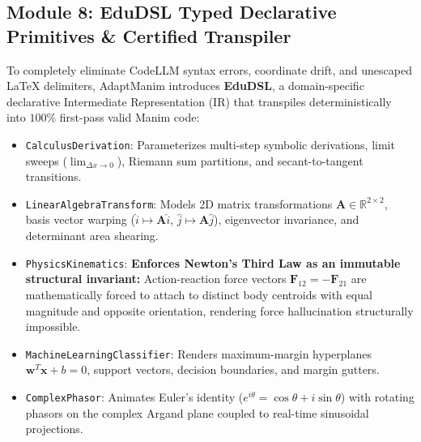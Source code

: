 \documentclass[11pt, a4paper]{article}
\begin{document}
\subsection{Module 8: EduDSL Typed Declarative Primitives \& Certified Transpiler}
To completely eliminate CodeLLM syntax errors, coordinate drift, and unescaped \LaTeX{} delimiters, AdaptManim introduces \textbf{EduDSL}, a domain-specific declarative Intermediate Representation (IR) that transpiles deterministically into $100\%$ first-pass valid Manim code:
\begin{itemize}[leftmargin=*]
    \item \texttt{CalculusDerivation}: Parameterizes multi-step symbolic derivations, limit sweeps ($\lim_{\Delta x \to 0}$), Riemann sum partitions, and secant-to-tangent transitions.
    \item \texttt{LinearAlgebraTransform}: Models 2D matrix transformations $\mathbf{A} \in \mathbb{R}^{2\times 2}$, basis vector warping ($\hat{i} \mapsto \mathbf{A}\hat{i}$, $\hat{j} \mapsto \mathbf{A}\hat{j}$), eigenvector invariance, and determinant area shearing.
    \item \texttt{PhysicsKinematics}: \textbf{Enforces Newton's Third Law as an immutable structural invariant:} Action-reaction force vectors $\mathbf{F}_{12} = -\mathbf{F}_{21}$ are mathematically forced to attach to distinct body centroids with equal magnitude and opposite orientation, rendering force hallucination structurally impossible.
    \item \texttt{MachineLearningClassifier}: Renders maximum-margin hyperplanes $\mathbf{w}^T\mathbf{x} + b = 0$, support vectors, decision boundaries, and margin gutters.
    \item \texttt{ComplexPhasor}: Animates Euler's identity ($e^{i\theta} = \cos\theta + i\sin\theta$) with rotating phasors on the complex Argand plane coupled to real-time sinusoidal projections.
\end{itemize}
\end{document}
